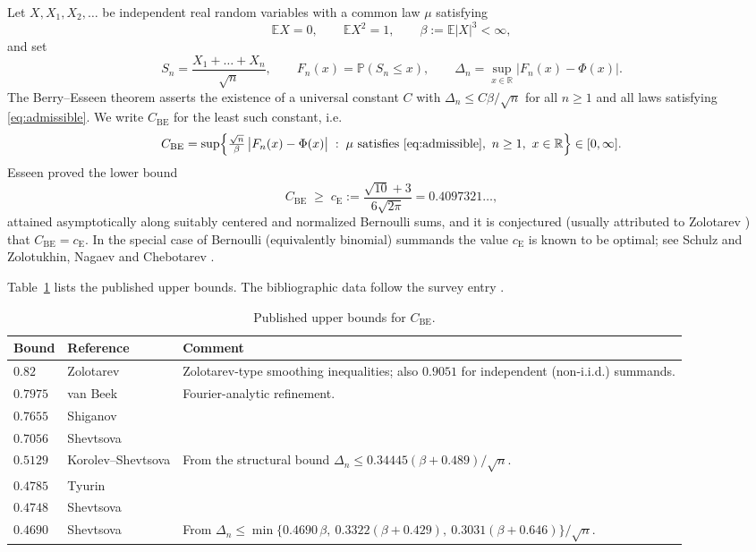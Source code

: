 \documentclass[11pt,a4paper]{article}
\theoremstyle{definition}
\newcommand{\RR}{\mathbb{R}}
\newcommand{\EE}{\mathbb{E}}
\newcommand{\PP}{\mathbb{P}}
\begin{document}
Let $X,X_1,X_2,\dots$ be independent real random variables with a common law
$\mu$ satisfying
\begin{equation}
  \label{eq:admissible}
  \EE X = 0,\qquad \EE X^2 = 1,\qquad \beta:=\EE|X|^3<\infty ,
\end{equation}
and set
\[
  S_n=\frac{X_1+\dots+X_n}{\sqrt n},\qquad
  F_n(x)=\PP(S_n\le x),\qquad
  \Delta_n=\sup_{x\in\RR}\bigl|F_n(x)-\Phi(x)\bigr| .
\]
The Berry--Esseen theorem \cite{Berry1941,Esseen1942} asserts the existence of a
universal constant $C$ with $\Delta_n\le C\beta/\sqrt n$ for all $n\ge1$ and all
laws satisfying \eqref{eq:admissible}. We write $C_{\mathrm{BE}}$ for the least
such constant, i.e.
\begin{equation}
  \label{eq:constant}
  C_{\mathrm{BE}}
  =\sup\Bigl\{\tfrac{\sqrt n}{\beta}\,\bigl|F_n(x)-\Phi(x)\bigr|
  \;:\;\mu \text{ satisfies } \eqref{eq:admissible},\ n\ge1,\ x\in\RR\Bigr\}
  \in[0,\infty] .
\end{equation}
Esseen \cite{Esseen1956} proved the lower bound
\[
  C_{\mathrm{BE}}\;\ge\;c_{\mathrm E}:=\frac{\sqrt{10}+3}{6\sqrt{2\pi}}
  =0.4097321\ldots,
\]
attained asymptotically along suitably centered and normalized Bernoulli sums,
and it is conjectured (usually attributed to Zolotarev \cite{Zolotarev1967}) that
$C_{\mathrm{BE}}=c_{\mathrm E}$. In the special case of Bernoulli (equivalently
binomial) summands the value $c_{\mathrm E}$ is known to be optimal; see
Schulz \cite{Schulz2016} and Zolotukhin, Nagaev and Chebotarev
\cite{Zolotukhin2018}.

Table~\ref{tab:history} lists the published upper bounds. The bibliographic data
follow the survey entry \cite{Tao2026}.

\begin{table}[htbp]
  \centering
  \begin{tabular}{llp{7.4cm}}
    \toprule
    Bound & Reference & Comment\\
    \midrule
    $0.82$   & Zolotarev \cite{Zolotarev1967}        & Zolotarev-type smoothing inequalities; also $0.9051$ for independent (non-i.i.d.) summands.\\
    $0.7975$ & van Beek \cite{vanBeek1972}            & Fourier-analytic refinement.\\
    $0.7655$ & Shiganov \cite{Shiganov1986}           & \\
    $0.7056$ & Shevtsova \cite{Shevtsova2006}         & \\
    $0.5129$ & Korolev--Shevtsova \cite{KorolevShevtsova2009} & From the structural bound $\Delta_n\le0.34445(\beta+0.489)/\sqrt n$.\\
    $0.4785$ & Tyurin \cite{Tyurin2009}               & \\
    $0.4748$ & Shevtsova \cite{Shevtsova2011}         & \\
    $0.4690$ & Shevtsova \cite{Shevtsova2013}         & From
      $\Delta_n\le\min\{0.4690\,\beta,\ 0.3322(\beta+0.429),\ 0.3031(\beta+0.646)\}/\sqrt n$.\\
    \bottomrule
  \end{tabular}
  \caption{Published upper bounds for $C_{\mathrm{BE}}$.}
  \label{tab:history}
\end{table}
\end{document}
